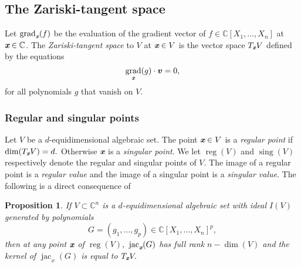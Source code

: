 \documentclass[a4paper]{article}
\def\xb{\textit{\textbf{x}}}
\DeclareMathOperator{\sing}{sing}
\DeclareMathOperator{\jac}{jac}
\DeclareMathOperator{\grad}{grad}
\DeclareMathOperator{\reg}{reg}
\def\C{\mathbb{C}}
\newtheorem{prop}[theorem]{Proposition}
\begin{document}
\subsection{The Zariski-tangent space}
Let $\grad_{\xb}(f)$ be the evaluation of the gradient vector of $f \in \C[X_1,\hdots,X_n]$ at $\xb \in \C$. The \textit{Zariski-tangent space} to $V$ at $\xb \in V$ is the vector space $T_{\xb}V$ defined by the equations 
\[
\grad_{\xb} (g) \cdot \bm v = 0,
\] 
for all polynomials $g$ that vanish on $V$. 
%
\subsubsection{Regular and singular points}
%
Let $V$ be a $d$-equidimensional algebraic set. 
The point $\xb \in V$ is a \textit{regular point} if $\dim (T_{\xb}V) = d.$ Otherwise $\xb$ is a \textit{singular point}. We let $\reg(V)$ and $\sing(V)$ respectively denote the regular and singular points of $V$. The image of a regular point is a \textit{regular value} and the image of a singular point is a \textit{singular value}.
%
The following is a direct consequence of \cite[Corollary 16.20]{ECA}
%
\begin{prop}
If $V \subset \C^n$ is a $d$-equidimensional algebraic set with ideal $I(V)$ generated by polynomials 
\[
G=(g_1,\hdots,g_p) \in \C[X_1,\hdots,X_n]^p,
\]
then at any point $\xb$ of $\reg(V),$ $\jac_{\xb}(G)$ has full rank $n - \dim(V)$ and the kernel of $\jac_x(G)$ is equal to $T_{\xb}V.$ 
\end{prop}
%
\end{document}
